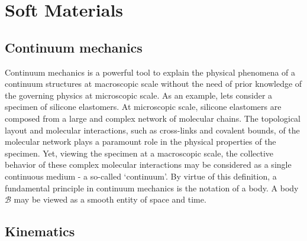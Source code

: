 \chapter{Soft Materials}
\label{ch:3-sensing} 
\section{Continuum mechanics}
Continuum mechanics is a powerful tool to explain the physical phenomena of a continuum structures at macroscopic scale without the need of prior knowledge of the governing physics at microscopic scale. As an example, lets consider a specimen of silicone elastomers. At microscopic scale, silicone elastomers are composed from a large and complex network of molecular chains. The topological layout and molecular interactions, such as cross-links and covalent bounds, of the molecular network plays a paramount role in the physical properties of the specimen. Yet, viewing the specimen at a macroscopic scale, the collective behavior of these complex molecular interactions may be considered as a single continuous medium - a so-called `continuum'. By virtue of this definition, a fundamental principle in continuum mechanics is the notation of a body. A body $\mathcal{B}$ may be viewed as a smooth entity of space and time. 

\section{Kinematics}

